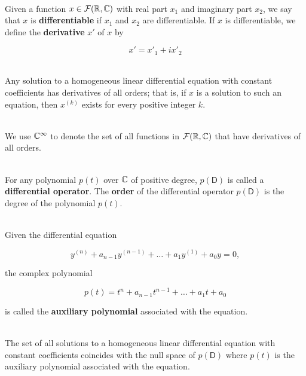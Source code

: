 \begin{definition}
	\hfill\\
	Given a function $x \in \mathcal{F}(\mathbb{R}, \mathbb{C})$ with real part $x_1$ and imaginary part $x_2$, we say that $x$ is \textbf{differentiable} if $x_1$ and $x_2$ are differentiable. If $x$ is differentiable, we define the \textbf{derivative} $x'$ of $x$ by

	\[x' = x'_1 + ix'_2\]
\end{definition}

\begin{theorem}
	\hfill\\
	Any solution to a homogeneous linear differential equation with constant coefficients has derivatives of all orders; that is, if $x$ is a solution to such an equation, then $x^(k)$ exists for every positive integer $k$.
\end{theorem}

\begin{definition}
	\hfill\\
	We use $\mathbb{C}^\infty$ to denote the set of all functions in $\mathcal{F}(\mathbb{R}, \mathbb{C})$ that have derivatives of all orders.
\end{definition}

\begin{definition}
	\hfill\\
	For any polynomial $p(t)$ over $\mathbb{C}$ of positive degree, $p(\mathsf{D})$ is called a \textbf{differential operator}. The \textbf{order} of the differential operator $p(\mathsf{D})$ is the degree of the polynomial $p(t)$.
\end{definition}

\begin{definition}
	\hfill\\
	Given the differential equation

	\[y^{(n)} + a_{n-1}y^{(n-1)}+ \dots + a_1y^{(1)} + a_0y = 0,\]

	the complex polynomial

	\[p(t) = t^n + a_{n-1}t^{n-1} + \dots + a_1t + a_0\]

	is called the \textbf{auxiliary polynomial} associated with the equation.
\end{definition}

\begin{theorem}
	\hfill\\
	The set of all solutions to a homogeneous linear differential equation with constant coefficients coincides with the null space of $p(\mathsf{D})$ where $p(t)$ is the auxiliary polynomial associated with the equation.
\end{theorem}

